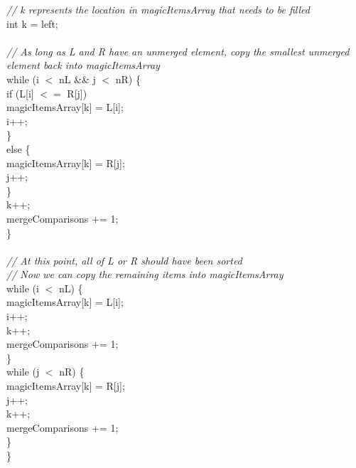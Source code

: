 \documentclass{article}
\begin{document}
{    \textit{\indent // k represents the location in magicItemsArray that needs to be filled\\}
    \indent int k = left;\\
\\
    \textit{\indent // As long as L and R have an unmerged element, copy the smallest unmerged element back into magicItemsArray\\}
    \indent while (i $<$ nL \&\& j $<$ nR) \{\\
        \indent \indent if (L[i] $<=$ R[j]) {\\
            \indent \indent \indent magicItemsArray[k] = L[i];\\
            \indent \indent \indent i++;\\
        \indent \indent \}\\
        \indent \indent else \{\\
            \indent \indent \indent magicItemsArray[k] = R[j];\\
            \indent \indent \indent j++;\\
        \indent \indent \}\\
        \indent \indent k++;\\
        \indent \indent mergeComparisons += 1;\\
    \indent \}\\
\\
    \textit{\indent // At this point, all of L or R should have been sorted\\
    \indent // Now we can copy the remaining items into magicItemsArray\\}
    \indent while (i $<$ nL) \{\\
        \indent \indent magicItemsArray[k] = L[i];\\
        \indent \indent i++;\\
        \indent \indent k++;\\
        \indent \indent mergeComparisons += 1;\\
    \indent \}\\
    \indent while (j $<$ nR) \{\\
        \indent \indent magicItemsArray[k] = R[j];\\
        \indent \indent j++;\\
        \indent \indent k++;\\
        \indent \indent mergeComparisons += 1;\\
    \indent \}\\
\}\\ } }
\end{document}
